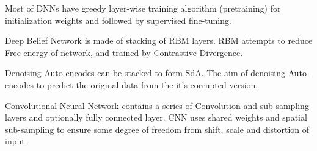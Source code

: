 Most of DNNs have greedy layer-wise training algorithm (pretraining) for initialization weights and followed by supervised fine-tuning.
 
Deep Belief Network is made of stacking of RBM layers. RBM attempts to reduce Free energy of network, and trained by Contrastive Divergence.
  
Denoising Auto-encodes can be stacked to form SdA. The aim of denoising Auto-encodes to predict the original data from the it's corrupted version.

Convolutional Neural Network contains a series of Convolution and sub sampling layers and optionally fully connected layer. CNN uses shared weights and spatial sub-sampling to ensure some degree of freedom from shift, scale and distortion of input.
